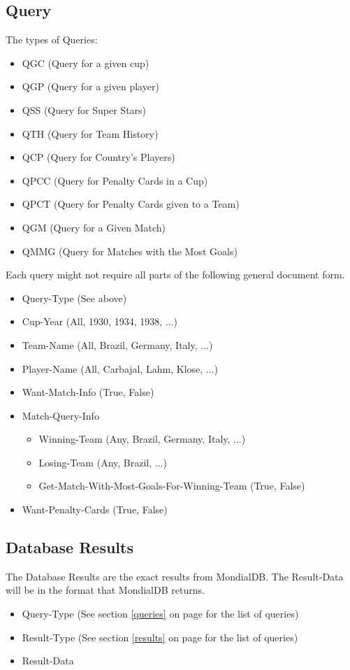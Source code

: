 \documentclass{article}
\begin{document}
\subsection{Query}
The types of Queries:
\begin{itemize}
	\label{queries}
	\item QGC (Query for a given cup)
	\item QGP (Query for a given player)
	\item QSS (Query for Super Stars)
	\item QTH (Query for Team History)
	\item QCP (Query for Country's Players)
	\item QPCC (Query for Penalty Cards in a Cup)
	\item QPCT (Query for Penalty Cards given to a Team)
	\item QGM (Query for a Given Match)
	\item QMMG (Query for Matches with the Most Goals)
\end{itemize}
Each query might not require all parts of the following general document form.
\begin{itemize}
	\item Query-Type (See above)
	\item Cup-Year (All, 1930, 1934, 1938, ...)
	\item Team-Name (All, Brazil, Germany, Italy, ...)
	\item Player-Name (All, Carbajal, Lahm, Klose, ...)
	\item Want-Match-Info (True, False)
	\item Match-Query-Info
	\begin{itemize}
		\item Winning-Team (Any, Brazil, Germany, Italy, ...)
		\item Losing-Team (Any, Brazil, ...)
		\item Get-Match-With-Most-Goals-For-Winning-Team (True, False)
	\end{itemize}
	\item Want-Penalty-Cards (True, False)
\end{itemize}

\subsection{Database Results}
The Database Results are the exact results from MondialDB.
The Result-Data will be in the format that MondialDB returns.
\begin{itemize}
	\item Query-Type (See section \ref{queries} on page \pageref{queries}  for the list of queries)
	\item Result-Type (See section \ref{results} on page \pageref{results}  for the list of queries)
	\item Result-Data
\end{itemize}
\end{document}
